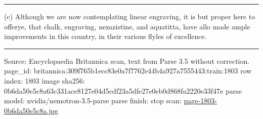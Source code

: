 \documentclass[10pt]{article}
\begin{document}
\par\vspace{4pt}\noindent\rule{0.3\linewidth}{0.4pt}\par
{\footnotesize
(c) Although we are now contemplating linear engraving, it is but proper here to offerye, that chalk, engraving, nezazistine, and aquatitta, have allo made ample improvements in this country, in their various flyles of excellence.\par}
\vfill\par\noindent\rule{\linewidth}{0.4pt}\par
{\scriptsize\color{gray}\noindent Source: Encyclopaedia Britannica scan, text from Parse 3.5 without correction. page\_id: britannica:309f765b1ecc83e0a7f7762e44b4a927a7555443:train:1803 \quad row index: 1803 \quad image sha256: 0b6da50e5c8a63c331ace8127e04d5cdf23a5dfe27e0eb0d868fa2220e33f47e \quad parse model: nvidia/nemotron-3.5-parse \quad parse finish: stop \quad scan: \href{../scans/page-1803-0b6da50e5c8a.jpg}{page-1803-0b6da50e5c8a.jpg}\par}
\end{document}
